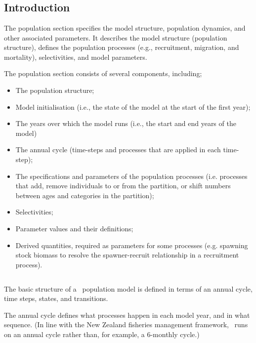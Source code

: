 \section{\label{sec:population-section}}

\subsection{Introduction}
The population section specifies the model structure, population dynamics, and other associated parameters. It describes the model structure (population structure), defines the population processes (e.g., recruitment, migration, and mortality), selectivities, and model parameters.

The population section consists of several components, including;
\begin{itemize}
  \item The population structure;
  \item Model initialisation (i.e., the state of the model at the start of the first year);
  \item The years over which the model runs (i.e., the start and end years of the model)
  \item The annual cycle (time-steps and processes that are applied in each time-step);
  \item The specifications and parameters of the population processes (i.e. processes that add, remove individuals to or from the partition, or shift numbers between ages and categories in the partition);
  \item Selectivities;
  \item Parameter values and their definitions;
  \item Derived quantities, required as parameters for some processes (e.g. spawning stock biomass to resolve the spawner-recruit relationship in a recruitment process).
\end{itemize}


\subsection{}

The basic structure of a \CNAME\ population model is defined in terms of an annual cycle, time steps, states, and transitions.

The annual cycle defines what processes happen in each model year, and in what sequence. (In line with the New Zealand fisheries management framework, \CNAME\ runs on an annual cycle rather than, for example, a 6-monthly cycle.) 

